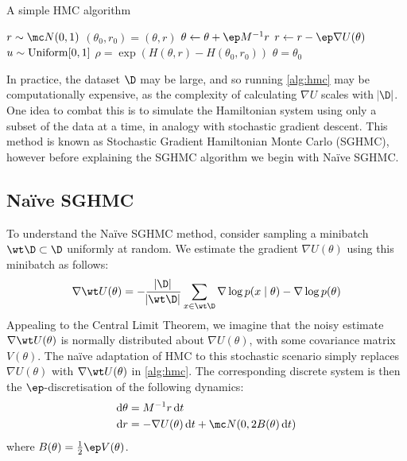 \begin{algorithm}
    \caption{A simple HMC algorithm}\label{alg:hmc}
    \begin{algorithmic}
            \State $r \sim \mc N(0,1)$ 
            \State $(\theta_0, r_0) = (\theta, r)$ 
                \State $\theta \gets \theta + \ep M^{-1}r$
                \State $r \gets r - \ep \nabla U(\theta)$
            \EndFor
            \State $u \sim \rm{Uniform}[0,1]$
            \State $\rho = \exp(H(\theta, r) - H(\theta_0, r_0))$ 
             
                \State $\theta = \theta_0$
            \EndIf
        \EndFor
    \end{algorithmic}
\end{algorithm}

In practice, the dataset $\D$ may be large, and so running \cref{alg:hmc} may be computationally expensive, as the complexity of calculating $\nabla U$ scales with $\abs\D$. One idea to combat this is to simulate the Hamiltonian system using only a subset of the data at a time, in analogy with stochastic gradient descent. This method is known as Stochastic Gradient Hamiltonian Monte Carlo (SGHMC), however before explaining the SGHMC algorithm we begin with Naïve SGHMC.


\subsection{Naïve SGHMC}

To understand the Naïve SGHMC method, consider sampling a minibatch $\wt\D \subset \D$ uniformly at random. We estimate the gradient $\nabla U(\theta)$ using this minibatch as follows:
\begin{equation*}
    \nabla \wt U(\theta) = - \frac{\abs\D}{\abs{\wt\D}}\sum_{x \in \wt\D} \nabla \log p(x \mid \theta) - \nabla \log p(\theta)
\end{equation*}
Appealing to the Central Limit Theorem, we imagine that the noisy estimate $\nabla \wt U(\theta)$ is normally distributed about $\nabla U(\theta)$, with some covariance matrix $V(\theta)$. The naïve adaptation of HMC to this stochastic scenario simply replaces $\nabla U(\theta)$ with $\nabla \wt U(\theta)$ in \cref{alg:hmc}. The corresponding discrete system is then the $\ep$-discretisation of the following dynamics:
\begin{align*}
    \dif\theta &= M^{-1}r \dif t \\
    \dif r &= - \nabla U(\theta) \dif t + \mc N(0, 2B(\theta) \dif t)
\end{align*}
where $B(\theta) = \frac 1 2 \ep V(\theta)$.

